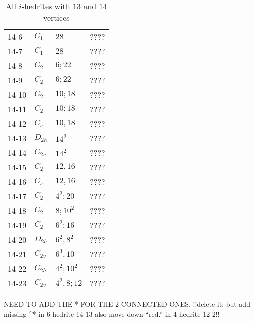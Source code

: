 \documentclass[12pt]{article}
\begin{document}
\begin{table}
\begin{center}
{\begin{minipage}[t]{6cm}
\begin{tabular}{||l|l|l|l||}
14-6 	&$C_1$	&$28$		&????\\
14-7 	&$C_1$	&$28$		&????\\
14-8	&$C_{2}$	&$6; 22$		&????\\
14-9 	&$C_2$	&$6; 22$		&????\\
14-10	&$C_2$	&$10; 18$		&????\\
14-11	&$C_2$	&$10; 18$		&????\\
14-12	&$C_s$	&$10, 18$		&????\\
14-13	&$D_{2h}$	&$14^2$		&????\\
14-14	&$C_{2v}$	&$14^2$		&????\\
14-15	&$C_2$	&$12, 16$		&????\\
14-16	&$C_{s}$	&$12, 16$		&????\\
14-17	&$C_2$	&$4^2; 20$	&????\\
14-18	&$C_2$	&$8; 10^2$	&????\\
14-19	&$C_2$	&$6^2; 16$	&????\\
14-20	&$D_{2h}$	&$6^2, 8^2$	&????\\
14-21	&$C_{2v}$	&$6^3, 10$	&????\\
14-22	&$C_{2h}$	&$4^2; 10^2$	&????\\
14-23	&$C_{2v}$	&$4^2, 8; 12$	&????\\\hline
\end{tabular}
\end{minipage}
}
NEED TO ADD THE * FOR THE 2-CONNECTED ONES. 
!!delete it; but add missing ^* in 6-hedrite 14-13
also move down ``red.'' in 4-hedrite 12-2!!

\end{center}
\caption{All $i$-hedrites with $13$ and $14$ vertices}
\label{tab:i-hedrite13_14}
\end{table}
\end{document}
